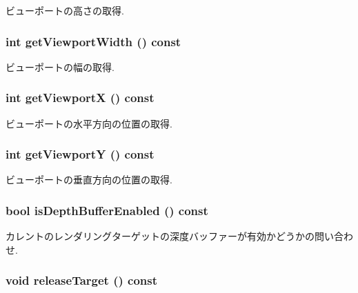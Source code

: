 ビューポートの高さの取得. \hypertarget{classm3g_1_1Graphics3D_768e5c057e2fa4c4b17a67134abbf89f}{
\subsubsection[{getViewportWidth}]{\setlength{\rightskip}{0pt plus 5cm}int getViewportWidth () const}}
\label{classm3g_1_1Graphics3D_768e5c057e2fa4c4b17a67134abbf89f}


ビューポートの幅の取得. \hypertarget{classm3g_1_1Graphics3D_af58b44cc6219f86c40dadb8a9377856}{
\subsubsection[{getViewportX}]{\setlength{\rightskip}{0pt plus 5cm}int getViewportX () const}}
\label{classm3g_1_1Graphics3D_af58b44cc6219f86c40dadb8a9377856}


ビューポートの水平方向の位置の取得. \hypertarget{classm3g_1_1Graphics3D_c21665afbf94a8f0153e099833c2b61a}{
\subsubsection[{getViewportY}]{\setlength{\rightskip}{0pt plus 5cm}int getViewportY () const}}
\label{classm3g_1_1Graphics3D_c21665afbf94a8f0153e099833c2b61a}


ビューポートの垂直方向の位置の取得. \hypertarget{classm3g_1_1Graphics3D_7f17c6781152840d42e756c27b0fb8c8}{
\subsubsection[{isDepthBufferEnabled}]{\setlength{\rightskip}{0pt plus 5cm}bool isDepthBufferEnabled () const}}
\label{classm3g_1_1Graphics3D_7f17c6781152840d42e756c27b0fb8c8}


カレントのレンダリングターゲットの深度バッファーが有効かどうかの問い合わせ. \hypertarget{classm3g_1_1Graphics3D_3ffaaf0d0f1e97a07c7f30c9b5a5dd32}{
\subsubsection[{releaseTarget}]{\setlength{\rightskip}{0pt plus 5cm}void releaseTarget () const}}
\label{classm3g_1_1Graphics3D_3ffaaf0d0f1e97a07c7f30c9b5a5dd32}



